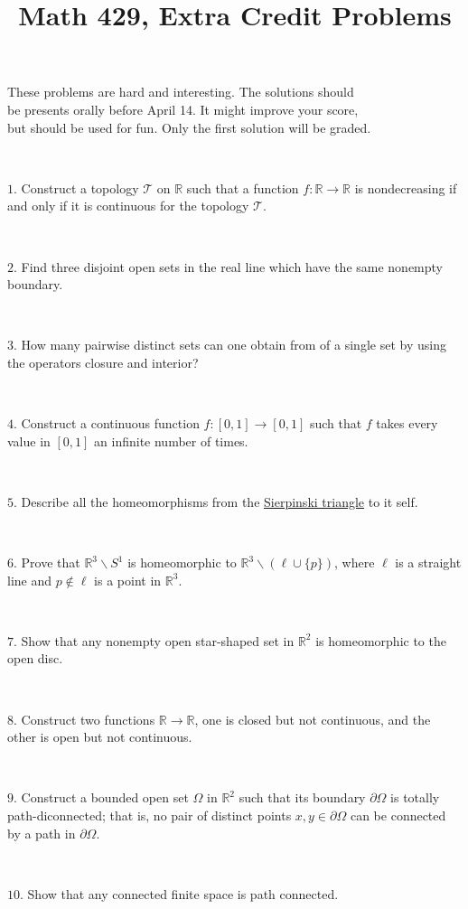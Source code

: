 \documentclass{article}
\def\noi{\noindent}%
\def\RR{\mathbb{R}}%
\def\:{\colon}
\begin{document}
\title{Math 429, Extra Credit Problems}
\author{}
\date{}
\maketitle

\begin{center}
{\small These problems are hard and interesting. The solutions should \\
be presents orally before April 14. It might improve your score,\\
but should be used for fun. Only the first solution will be graded.}
\end{center}
\thispagestyle{empty}

\ 


\noi $1$. Construct a topology $\mathcal{T}$ on $\RR$ such that a function $f\:\RR\to\RR$ is nondecreasing if and only if it is continuous for the topology $\mathcal{T}$.

\ 


\noi $2$. 
Find three disjoint open sets in the real line 
which have the same nonempty boundary. 

\ 

\noi $3$. How many pairwise distinct sets can one obtain
from of a single set by using the operators closure and interior?

\ 

\noi $4$. Construct a continuous function 
$f\:[0,1]\rightarrow [0,1]$ such that $f$ takes every value in $[0,1]$ 
an infinite number of times.

\ 

\noi $5$. Describe all the homeomorphisms from the \href{http://en.wikipedia.org/wiki/Sierpinski_triangle}{Sierpinski triangle} to it self.

\ 

\noi $6$. Prove that $\RR^3\backslash S^1$ is homeomorphic to $\RR^3\backslash (\ell\cup \{p\})$, where $\ell$ is a straight line and $p\not\in\ell$ is a point in $\RR^3$.


\ 


\noi $7.$ Show that any nonempty open star-shaped set in $\RR^2$ is homeomorphic to the open disc.

\ 


\noi $8.$ Construct two functions $\RR\to\RR$, one is closed but not continuous, and the other is open but not continuous.

\ 

\noi $9.$
Construct a bounded open set $\Omega$ in $\RR^2$
such that its boundary $\partial \Omega$ is totally path-diconnected;
that is, no pair of distinct points $x,y\in\partial \Omega$ can be connected by a path in $\partial \Omega$.

\ 

\noi $10.$ Show that any connected finite space is path connected.
\end{document}
